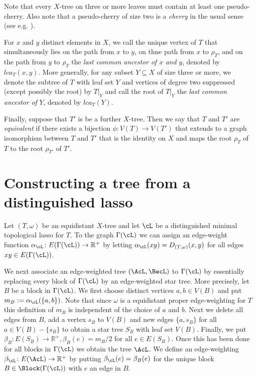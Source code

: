 Note that every $X$-tree on three or more leaves must contain at least one
pseudo-cherry. Also note that a pseudo-cherry of size two is a {\em cherry} in
the usual sense (see e.g. \cite{semple2003phylogenetics}).

For $x$ and $y$ distinct elements in $X$, we call the unique vertex of $T$
that simultaneously lies on the path from $x$ to $y$, on thne path from $x$ to
$\rho_T$, and on the path from $y$ to $\rho_T$ the {\em last common ancestor
  of $x$ and $y$}, denoted by $lca_T(x,y)$. More generally, for any subset
$Y\subseteq X$ of size three or more, we denote the subtree of $T$ with leaf
set $Y$ and vertices of degree two suppressed (except possibly the root) by
$T|_Y$ and call the root of $T|_Y$ the {\em last common ancestor of $Y$},
denoted by $lca_T(Y)$.

Finally, suppose that $T'$ is be a further $X$-tree. Then we say that $T$ and
$T'$ are {\em equivalent} if there exists a bijection $\phi:V(T)\to V(T')$
that extends to a graph isomorphism between $T$ and $T'$ that is the identity
on $X$ and maps the root $\rho_T$ of $T$ to the root $\rho_{T'}$ of $T'$.

\section{Constructing a tree from a distinguished lasso}
\label{sec:constr-tree-from}

Let $(T,\omega)$ be an equidistant $X$-tree and let $\cL$ be a distinguished
minimal topological lasso for $T$.  To the graph $\Gamma(\cL)$ we can assign
an edge-weight function $\alpha_{\cL} \colon E(\Gamma(\cL)) \to \mathbb{R}^+$
by letting $\alpha_{\cL}(xy) = D_{(T,\omega)}(x,y)$ for all edges $xy \in
E(\Gamma(\cL))$.

We next associate an edge-weighted tree $(\AcL,\BecL)$ to $\Gamma(\cL)$ by
essentially replacing every block of $\Gamma(\cL)$ by an edge-weighted star
tree.  More precisely, let $B$ be a block in $\Gamma(\cL)$.  We first choose
distinct vertices $a,b \in V(B)$ and put $m_B := \alpha_{\cL}(\{a,b\})$.  Note
that since $\omega$ is a equidistant proper edge-weighting for $T$ this
definition of $m_B$ is independent of the choice of $a$ and $b$.  Next we
delete all edges from $B$, add a vertex $s_B$ to $V(B)$ and new edges
$\{a,s_B\}$ for all $a \in V(B) - \{s_B\}$ to obtain a star tree $S_B$ with
leaf set $V(B)$.  Finally, we put $\beta_B \colon E(S_B) \to \mathbb{R}^+,
\beta_B(e) = m_B/2$ for all $e \in E(S_B)$.  Once this has been done for all
blocks in $\Gamma(\cL)$ we obtain the tree $\AcL$.  We define an
edge-weighting $\beta_{\cL} \colon E(\AcL) \to \mathbb{R}^+$ by putting
$\beta_{\cL}(e) = \beta_B(e)$ for the unique block $B \in \Block(\Gamma(\cL))$
with $e$ an edge in $B$.

